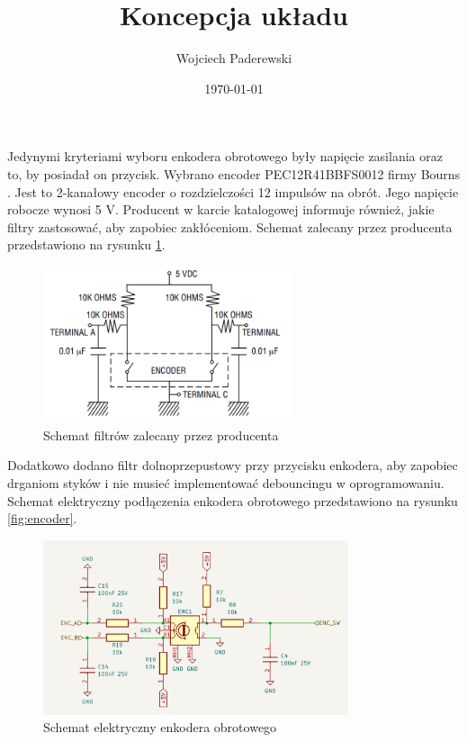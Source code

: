 \documentclass[../../main.tex]{subfiles}
\author{Wojciech Paderewski}
\date{\today}
\title{Koncepcja układu}
\begin{document}
Jedynymi kryteriami wyboru enkodera obrotowego były napięcie zasilania oraz to, by posiadał on przycisk.
Wybrano encoder PEC12R\-41BBF\-S0012 firmy Bourns \cite{st:encoder}. Jest to 2-kanałowy encoder o rozdzielczości 12 impulsów na obrót. 
Jego napięcie robocze wynosi 5 V. Producent w karcie katalogowej informuje również, jakie filtry zastosować, aby zapobiec zakłóceniom.
Schemat zalecany przez producenta przedstawiono na rysunku \ref{fig:encoder_karta}.

\begin{figure}[H]
    \centering
    \includegraphics[width=0.65\textwidth]{encoder_karta.png}
    \caption{Schemat filtrów zalecany przez producenta \cite{st:encoder}}
    \label{fig:encoder_karta}
\end{figure}

Dodatkowo dodano filtr dolnoprzepustowy przy przycisku enkodera, aby zapobiec drganiom styków i nie musieć implementować debouncingu w oprogramowaniu.
Schemat elektryczny podłączenia enkodera obrotowego przedstawiono na rysunku \ref{fig:encoder}.
\begin{figure}[H]
    \centering
    \includegraphics[width=0.8\textwidth]{encoder.png}
    \caption{Schemat elektryczny enkodera obrotowego}
\end{figure}
\end{document}
